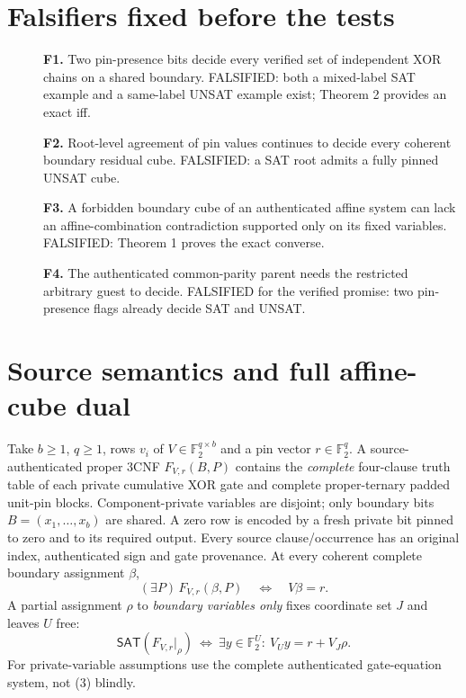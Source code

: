 \documentclass[11pt]{article}
\newcommand{\SAT}{\mathsf{SAT}}
\begin{document}
\section{Falsifiers fixed before the tests}
\begin{description}
\item[] \textbf{F1.} Two pin-presence bits decide every verified set of independent XOR chains on a shared boundary. FALSIFIED: both a mixed-label SAT example and a same-label UNSAT example exist; Theorem 2 provides an exact iff.
\item[] \textbf{F2.} Root-level agreement of pin values continues to decide every coherent boundary residual cube. FALSIFIED: a SAT root admits a fully pinned UNSAT cube.
\item[] \textbf{F3.} A forbidden boundary cube of an authenticated affine system can lack an affine-combination contradiction supported only on its fixed variables. FALSIFIED: Theorem 1 proves the exact converse.
\item[] \textbf{F4.} The authenticated common-parity parent needs the restricted arbitrary guest to decide. FALSIFIED for the verified promise: two pin-presence flags already decide SAT and UNSAT.
\end{description}

\section{Source semantics and full affine-cube dual}
Take $b\ge1$, $q\ge1$, rows $v_i$ of $V\in\mathbb F_2^{q\times b}$ and a pin vector $r\in\mathbb F_2^q$. A source-authenticated proper 3CNF $F_{V,r}(B,P)$ contains the \emph{complete} four-clause truth table of each private cumulative XOR gate and complete proper-ternary padded unit-pin blocks. Component-private variables are disjoint; only boundary bits $B=(x_1,\ldots,x_b)$ are shared. A zero row is encoded by a fresh private bit pinned to zero and to its required output. Every source clause/occurrence has an original index, authenticated sign and gate provenance. At every coherent complete boundary assignment $\beta$,
\[
(\exists P)\,F_{V,r}(\beta,P)\quad\Longleftrightarrow\quad V\beta=r. \tag{2}
\]
A partial assignment $\rho$ to \emph{boundary variables only} fixes coordinate set $J$ and leaves $U$ free:
\[
\SAT(F_{V,r}|_\rho)\ \Longleftrightarrow\
\exists y\in\mathbb F_2^U:\ V_Uy=r+V_J\rho. \tag{3}
\]
For private-variable assumptions use the complete authenticated gate-equation system, not (3) blindly.
\end{document}
